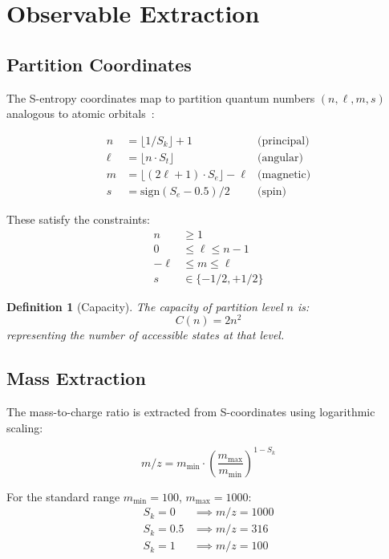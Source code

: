\documentclass[twocolumn,10pt]{article}
\newtheorem{definition}[theorem]{Definition}
\begin{document}
\section{Observable Extraction}
\label{sec:observables}

\subsection{Partition Coordinates}

The S-entropy coordinates map to partition quantum numbers $(n, \ell, m, s)$ analogous to atomic orbitals~\cite{griffiths2018introduction}:

\begin{align}
n &= \lfloor 1/S_k \rfloor + 1 & \text{(principal)} \\
\ell &= \lfloor n \cdot S_t \rfloor & \text{(angular)} \\
m &= \lfloor (2\ell + 1) \cdot S_e \rfloor - \ell & \text{(magnetic)} \\
s &= \text{sign}(S_e - 0.5)/2 & \text{(spin)}
\end{align}

These satisfy the constraints:
\begin{align}
n &\geq 1 \\
0 &\leq \ell \leq n - 1 \\
-\ell &\leq m \leq \ell \\
s &\in \{-1/2, +1/2\}
\end{align}

\begin{definition}[Capacity]
The capacity of partition level $n$ is:
\begin{equation}
C(n) = 2n^2
\end{equation}
representing the number of accessible states at that level.
\end{definition}

\subsection{Mass Extraction}

The mass-to-charge ratio is extracted from S-coordinates using logarithmic scaling:

\begin{equation}
m/z = m_{\min} \cdot \left( \frac{m_{\max}}{m_{\min}} \right)^{1 - S_k}
\end{equation}

For the standard range $m_{\min} = 100$, $m_{\max} = 1000$:
\begin{align}
S_k = 0 &\implies m/z = 1000 \\
S_k = 0.5 &\implies m/z = 316 \\
S_k = 1 &\implies m/z = 100
\end{align}
\end{document}
